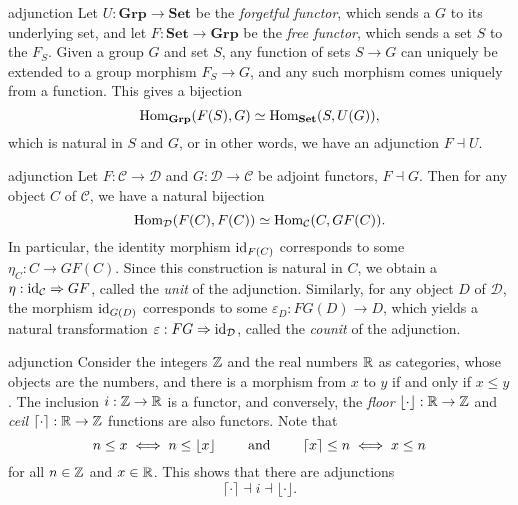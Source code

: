 \begin{example}{adjunction}
    Let $U : \textbf{Grp} \to \textbf{Set}$ be the \textit{forgetful functor}, which sends a  $G$ to its underlying set, and let $F : \textbf{Set} \to \textbf{Grp}$ be the \textit{free functor}, which sends a set $S$ to the  $F_S$. Given a group $G$ and set $S$, any function of sets $S \to G$ can uniquely be extended to a group morphism $F_S \to G$, and any such morphism comes uniquely from a function. This gives a bijection
    \[ \text{Hom}_{\textbf{Grp}}(F(S), G) \simeq \text{Hom}_{\textbf{Set}}(S, U(G)) , \]
    which is natural in $S$ and $G$, or in other words, we have an adjunction $F \dashv U$.
\end{example}

\begin{example}{adjunction}
    Let $F : \mathcal{C} \to \mathcal{D}$ and $G : \mathcal{D} \to \mathcal{C}$ be adjoint functors, $F \dashv G$. Then for any object $C$ of $\mathcal{C}$, we have a natural bijection
    \[ \text{Hom}_{\mathcal{D}}(F(C), F(C)) \simeq \text{Hom}_{\mathcal{C}}(C, GF(C)) . \]
    In particular, the identity morphism $\text{id}_{F(C)}$ corresponds to some $\eta_C : C \to GF(C)$. Since this construction is natural in $C$, we obtain a  $\eta : \text{id}_\mathcal{C} \Rightarrow GF$, called the \textit{unit} of the adjunction.
    Similarly, for any object $D$ of $\mathcal{D}$, the morphism $\text{id}_{G(D)}$ corresponds to some $\varepsilon_D : FG(D) \to D$, which yields a natural transformation $\varepsilon : FG \Rightarrow \text{id}_\mathcal{D}$, called the \textit{counit} of the adjunction.
\end{example}

\begin{example}{adjunction}
    Consider the integers $\mathbb{Z}$ and the real numbers $\mathbb{R}$ as categories, whose objects are the numbers, and there is a morphism from $x$ to $y$ if and only if $x \le y$. The inclusion $i : \mathbb{Z} \to \mathbb{R}$ is a functor, and conversely, the \textit{floor} $\lfloor \cdot \rfloor : \mathbb{R} \to \mathbb{Z}$ and \textit{ceil} $\lceil \cdot \rceil : \mathbb{R} \to \mathbb{Z}$ functions are also functors. Note that
    \[ n \le x \iff n \le \lfloor x \rfloor \qquad \textup{ and } \qquad \lceil x \rceil \le n \iff x \le n \]
    for all $n \in \mathbb{Z}$ and $x \in \mathbb{R}$. This shows that there are adjunctions
    \[ \lceil \cdot \rceil \dashv i \dashv \lfloor \cdot \rfloor . \]
\end{example}

